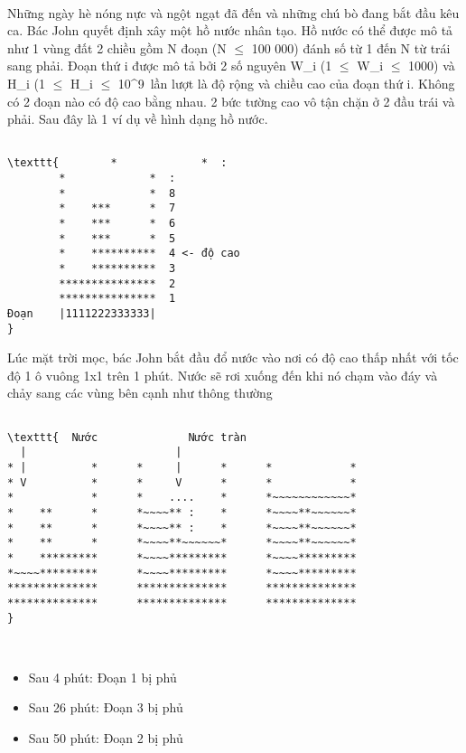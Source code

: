 

 

Những ngày hè nóng nực và ngột ngạt đã đến và những chú bò đang bắt đầu kêu ca. Bác John quyết định xây một hồ nước nhân tạo. Hồ nước có thể được mô tả như 1 vùng đất 2 chiều gồm N đoạn (N  $\le$  100 000) đánh số từ 1 đến N từ trái sang phải. Đoạn thứ i được mô tả bởi 2 số nguyên W\_i (1  $\le$  W\_i  $\le$  1000) và H\_i (1  $\le$  H\_i  $\le$  10^9 lần lượt là độ rộng và chiều cao của đoạn thứ i. Không có 2 đoạn nào có độ cao bằng nhau. 2 bức tường cao vô tận chặn ở 2 đầu trái và phải. Sau đây là 1 ví dụ về hình dạng hồ nước.
\begin{verbatim}

\texttt{        *             *  : 
        *             *  : 
        *             *  8 
        *    ***      *  7 
        *    ***      *  6 
        *    ***      *  5 
        *    **********  4 <- độ cao 
        *    **********  3 
        ***************  2 
        ***************  1 
Đoạn    |1111222333333| 
}\end{verbatim}

Lúc mặt trời mọc, bác John bắt đầu đổ nước vào nơi có độ cao thấp nhất với tốc độ 1 ô vuông 1x1 trên 1 phút. Nước sẽ rơi xuống đến khi nó chạm vào đáy và chảy sang các vùng bên cạnh như thông thường
\begin{verbatim}

\texttt{  Nước              Nước tràn 
  |                       |        
* |          *      *     |      *      *            * 
* V          *      *     V      *      *            * 
*            *      *    ....    *      *~~~~~~~~~~~~* 
*    **      *      *~~~~** :    *      *~~~~**~~~~~~* 
*    **      *      *~~~~** :    *      *~~~~**~~~~~~* 
*    **      *      *~~~~**~~~~~~*      *~~~~**~~~~~~* 
*    *********      *~~~~*********      *~~~~********* 
*~~~~*********      *~~~~*********      *~~~~********* 
**************      **************      ************** 
**************      **************      ************** 
}\end{verbatim}

 
\begin{itemize}
	\item 

Sau 4 phút: Đoạn 1 bị phủ
	\item 

Sau 26 phút: Đoạn 3 bị phủ
	\item 

Sau 50 phút: Đoạn 2 bị phủ
\end{itemize}

